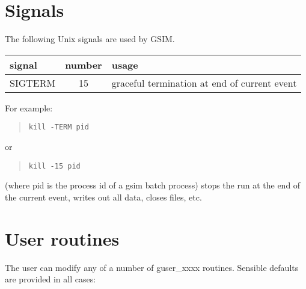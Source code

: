 \documentclass{article}
\begin{document}
\newpage
\section{Signals}
\label{signals}

The following Unix signals are used by GSIM.
\par
\begin{center}
\begin{tabular}{|l|c|l|} \hline
signal   &  number  &  usage \\ \hline
SIGTERM  &   15     &  graceful termination at end of current event \\ \hline
\end{tabular}
\end{center}

\noindent
For example:
\begin{quote}
{\tt kill -TERM pid}
\end{quote}
or
\begin{quote}
{\tt kill -15 pid}
\end{quote}
(where pid is the process id of a gsim batch process) stops the
run at the end of the current event, writes out all data, closes
files, etc.

\newpage
\section{User routines}
\label{userroutines}

The user can modify any of a number of guser\_xxxx routines.  Sensible
defaults are provided in all cases:
\end{document}
